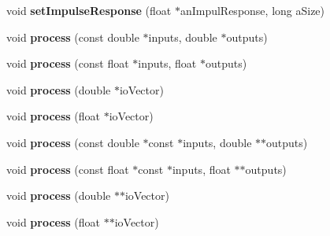\begin{DoxyCompactItemize}
\item 
\hypertarget{class_ambisonic_convolver_acc87ecab4e58ec63091e4d69c4bff2ef}{void {\bfseries set\-Impulse\-Response} (float $\ast$an\-Impul\-Response, long a\-Size)}\label{class_ambisonic_convolver_acc87ecab4e58ec63091e4d69c4bff2ef}

\item 
\hypertarget{class_ambisonic_convolver_ad50e45d681664198755733d3f8f93289}{void {\bfseries process} (const double $\ast$inputs, double $\ast$outputs)}\label{class_ambisonic_convolver_ad50e45d681664198755733d3f8f93289}

\item 
\hypertarget{class_ambisonic_convolver_a8eedb4a531143d155ee60f6c2af98429}{void {\bfseries process} (const float $\ast$inputs, float $\ast$outputs)}\label{class_ambisonic_convolver_a8eedb4a531143d155ee60f6c2af98429}

\item 
\hypertarget{class_ambisonic_convolver_a165d19a71032cc231793d4014eb33262}{void {\bfseries process} (double $\ast$io\-Vector)}\label{class_ambisonic_convolver_a165d19a71032cc231793d4014eb33262}

\item 
\hypertarget{class_ambisonic_convolver_a72bd510bb3d053b0f7c6d2b91a53ffb6}{void {\bfseries process} (float $\ast$io\-Vector)}\label{class_ambisonic_convolver_a72bd510bb3d053b0f7c6d2b91a53ffb6}

\item 
\hypertarget{class_ambisonic_convolver_a71f2ba55bbbcb1781af9de83b214934b}{void {\bfseries process} (const double $\ast$const $\ast$inputs, double $\ast$$\ast$outputs)}\label{class_ambisonic_convolver_a71f2ba55bbbcb1781af9de83b214934b}

\item 
\hypertarget{class_ambisonic_convolver_ad3c3cbdfe98b76ef92c9cf6addf30bad}{void {\bfseries process} (const float $\ast$const $\ast$inputs, float $\ast$$\ast$outputs)}\label{class_ambisonic_convolver_ad3c3cbdfe98b76ef92c9cf6addf30bad}

\item 
\hypertarget{class_ambisonic_convolver_afa4e627a0d030a7e9bf1a7a1b2304efe}{void {\bfseries process} (double $\ast$$\ast$io\-Vector)}\label{class_ambisonic_convolver_afa4e627a0d030a7e9bf1a7a1b2304efe}

\item 
\hypertarget{class_ambisonic_convolver_aa1065d5ed67c861a621b6c70a6ab04ee}{void {\bfseries process} (float $\ast$$\ast$io\-Vector)}\label{class_ambisonic_convolver_aa1065d5ed67c861a621b6c70a6ab04ee}

\end{DoxyCompactItemize}

